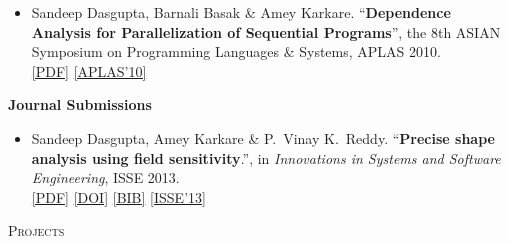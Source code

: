 \documentclass[9pt]{article}
\newenvironment{changemargin}[2]{%
  \begin{list}{}{%
    \setlength{\topsep}{0pt}%
    \setlength{\leftmargin}{#1}%
    \setlength{\rightmargin}{#2}%
    \setlength{\listparindent}{\parindent}%
    \setlength{\itemindent}{\parindent}%
    \setlength{\parsep}{\parskip}%
  }%
  \item[]}{\end{list}
}
\newcommand{\lineover}{
	\begin{changemargin}{-0.05in}{-0.05in}
		\vspace*{-8pt}
		\hrulefill \\
		\vspace*{-2pt}
	\end{changemargin}
}
\newcommand{\header}[1]{
	\begin{changemargin}{-0.5in}{-0.5in}
		\scshape{#1}\\
  	\lineover
	\end{changemargin}
}
\newenvironment{body} {
	\vspace*{-16pt}
	\begin{changemargin}{-0.25in}{-0.5in}
  }	
	{\end{changemargin}
}
\begin{document}
\begin{body}
\begin{itemize}
                \item Sandeep Dasgupta, Barnali Basak \& Amey Karkare. ``\textbf{Dependence Analysis for Parallelization of Sequential Programs}'', the 8th ASIAN
                  Symposium on Programming Languages \& Systems, APLAS 2010. \\
                  \href{http://webhost.engr.illinois.edu/~sdasgup3/Document/poster_APLAS2010.pdf}{[PDF]}
                  \href{https://basics.sjtu.edu.cn/conference/aplas2010/accepted_posters.htm}{[APLAS'10]}
	\end{itemize}

\textbf{Journal Submissions}\\
	\vspace{-4pt}
	\begin{itemize} \itemsep -0pt
		\item  Sandeep Dasgupta, Amey Karkare \& P.\ Vinay K.\ Reddy. ``\textbf{Precise shape analysis using field sensitivity}.'', in \emph{Innovations in Systems and Software Engineering}, ISSE 2013. \\
                 \href{http://webhost.engr.illinois.edu/~sdasgup3/Document/isse_2013.pdf}{[PDF]}
                 \href{http://www.springerlink.com/openurl.asp?genre=article&id=doi:10.1007/s11334-013-0198-7}{[DOI]}
                 \href{http://webhost.engr.illinois.edu/~sdasgup3/Document/isse_2013.bib}{[BIB]}
                 \href{https://link.springer.com/journal/11334}{[ISSE'13]}
	\end{itemize}
\end{body}

\smallskip

\header{Projects}
\end{document}
